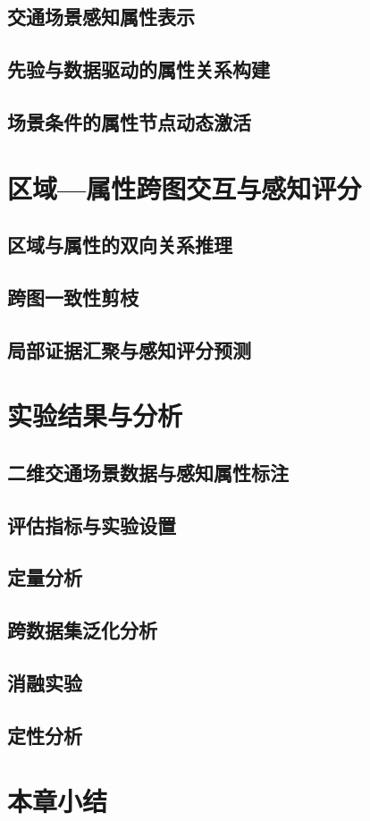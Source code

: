 \subsection{交通场景感知属性表示}

\subsection{先验与数据驱动的属性关系构建}

\subsection{场景条件的属性节点动态激活}

\section{区域—属性跨图交互与感知评分}

\subsection{区域与属性的双向关系推理}

\subsection{跨图一致性剪枝}

\subsection{局部证据汇聚与感知评分预测}

\section{实验结果与分析}

\subsection{二维交通场景数据与感知属性标注}

\subsection{评估指标与实验设置}

\subsection{定量分析}

\subsection{跨数据集泛化分析}

\subsection{消融实验}

\subsection{定性分析}

\section{本章小结}
